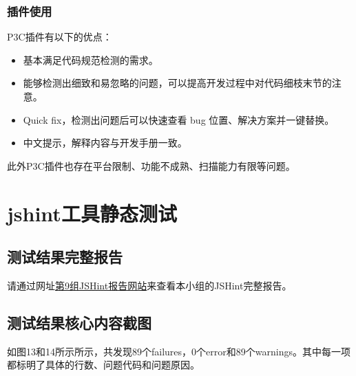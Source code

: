 \documentclass[hyperref, a4paper]{ctexart}
\providecommand{\tightlist}{%
  \setlength{\itemsep}{0pt}\setlength{\parskip}{0pt}}
\begin{document}
\hypertarget{ux63d2ux4ef6ux4f7fux7528}{%
\subsubsection{插件使用}\label{ux63d2ux4ef6ux4f7fux7528}}

P3C插件有以下的优点：

\begin{itemize}
\tightlist
\item
  基本满足代码规范检测的需求。
\item
  能够检测出细致和易忽略的问题，可以提高开发过程中对代码细枝末节的注意。
\item
  Quick fix，检测出问题后可以快速查看 bug 位置、解决方案并一键替换。
\item
  中文提示，解释内容与开发手册一致。
\end{itemize}

此外P3C插件也存在平台限制、功能不成熟、扫描能力有限等问题。

\hypertarget{jshintux5de5ux5177ux9759ux6001ux6d4bux8bd5}{%
\section{jshint工具静态测试}\label{jshintux5de5ux5177ux9759ux6001ux6d4bux8bd5}}

\hypertarget{ux6d4bux8bd5ux7ed3ux679cux5b8cux6574ux62a5ux544a-2}{%
\subsection{测试结果完整报告}\label{ux6d4bux8bd5ux7ed3ux679cux5b8cux6574ux62a5ux544a-2}}

请通过网址\href{https://straybird-atsh.github.io/SoftwareQA-Testing/JSHintReport.html}{第9组JSHint报告网站}来查看本小组的JSHint完整报告。

\hypertarget{ux6d4bux8bd5ux7ed3ux679cux6838ux5fc3ux5185ux5bb9ux622aux56fe-2}{%
\subsection{测试结果核心内容截图}\label{ux6d4bux8bd5ux7ed3ux679cux6838ux5fc3ux5185ux5bb9ux622aux56fe-2}}

如图13和14所示所示，共发现89个failures，0个error和89个warnings。其中每一项都标明了具体的行数、问题代码和问题原因。
\end{document}
